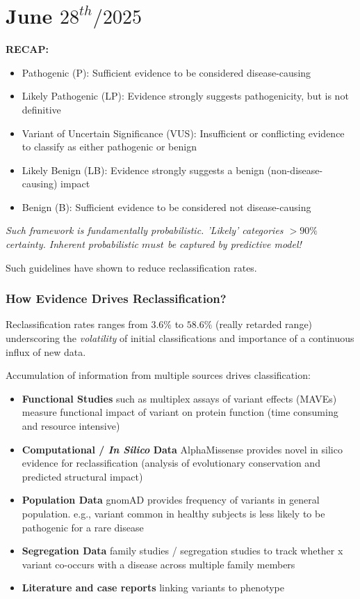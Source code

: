\documentclass[../main.tex]{subfiles}
\begin{document}
\chapter{June $28^{th} / 2025$}
\label{ch:tufte-design}

\textbf{RECAP:}
\begin{itemize}
    \item Pathogenic (P): Sufficient evidence to be considered disease-causing
    \item Likely Pathogenic (LP): Evidence strongly suggests pathogenicity, but is not definitive
    \item Variant of Uncertain Significance (VUS): Insufficient or conflicting evidence to
classify as either pathogenic or benign
    \item Likely Benign (LB): Evidence strongly suggests a benign (non-disease-causing)
impact
    \item Benign (B): Sufficient evidence to be considered not disease-causing
\end{itemize}

\textit{Such framework is fundamentally probabilistic. 'Likely' categories $> 90\%$ certainty. Inherent probabilistic $must$ be captured by predictive model!}

\vspace{0.3cm}

Such guidelines have shown to reduce reclassification rates.

\hrulefill

\subsection{How Evidence Drives Reclassification?}

Reclassification rates ranges from $3.6\%$ to $58.6\%$ (really retarded range) underscoring the \textit{volatility} of initial classifications and importance of a continuous influx of new data.

Accumulation of information from multiple sources drives classification:
\begin{itemize}
    \item \textbf{Functional Studies} such as multiplex assays of variant effects (MAVEs) measure functional impact of variant on protein function (time consuming and resource intensive)
    \item \textbf{Computational / \textit{In Silico} Data} AlphaMissense provides novel in silico evidence for reclassification (analysis of evolutionary conservation and predicted structural impact)
    \item \textbf{Population Data} gnomAD provides frequency of variants in general population. e.g., variant common in healthy subjects is less likely to be pathogenic for a rare disease
    \item \textbf{Segregation Data} family studies / segregation studies to track whether x variant co-occurs with a disease across multiple family members
    \item \textbf{Literature and case reports} linking variants to phenotype
\end{itemize}
\end{document}
